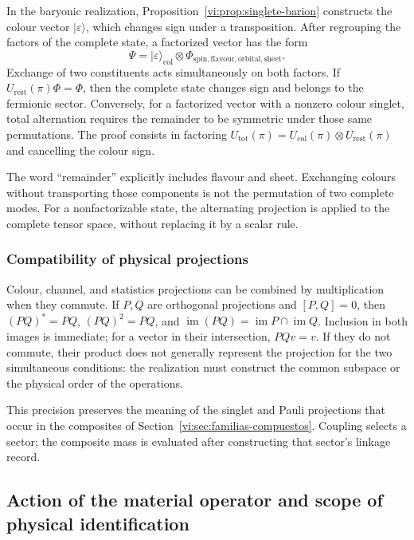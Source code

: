 In the baryonic realization,
Proposition~\ref{vi:prop:singlete-barion} constructs the colour
vector \(|\varepsilon\rangle\), which changes sign under a
transposition. After regrouping the factors of the complete state,
a factorized vector has the form
\[
 \Psi=|\varepsilon\rangle_{\mathrm{col}}
 \otimes\Phi_{\mathrm{spin,flavour,orbital,sheet}}.
\]
Exchange of two constituents acts simultaneously on both factors.
If \(U_{\mathrm{rest}}(\pi)\Phi=\Phi\), then the complete state
changes sign and belongs to the fermionic sector.
Conversely, for a factorized vector with a nonzero colour singlet,
total alternation requires the remainder to be symmetric under
those same permutations. The proof consists in factoring
\(U_{\mathrm{tot}}(\pi)=U_{\mathrm{col}}(\pi)\otimes
U_{\mathrm{rest}}(\pi)\) and cancelling the colour sign.

The word “remainder” explicitly includes flavour and sheet.
Exchanging colours without transporting those components is not
the permutation of two complete modes. For a nonfactorizable state,
the alternating projection is applied to the complete tensor space,
without replacing it by a scalar rule.

\subsubsection{Compatibility of physical projections}

Colour, channel, and statistics projections can be combined by
multiplication when they commute. If \(P,Q\) are orthogonal
projections and \([P,Q]=0\), then
\((PQ)^*=PQ\), \((PQ)^2=PQ\), and
\(\operatorname{im}(PQ)=\operatorname{im}P\cap\operatorname{im}Q\).
Inclusion in both images is immediate; for a vector in their
intersection, \(PQv=v\).
If they do not commute, their product does not generally represent
the projection for the two simultaneous conditions: the realization
must construct the common subspace or the physical order of the
operations.

This precision preserves the meaning of the singlet and Pauli
projections that occur in the composites of
Section~\ref{vi:sec:familias-compuestos}. Coupling selects a
sector; the composite mass is evaluated after constructing
that sector's linkage record.

\subsection{Action of the material operator and scope of physical identification}
\label{vi:subsec:fock-alcance}


